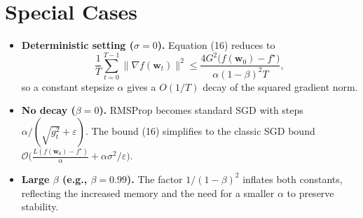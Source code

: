 \documentclass{article}
\begin{document}
\section*{Special Cases}
\begin{itemize}
\item \textbf{Deterministic setting ($\sigma=0$).}
Equation (16) reduces to
\[
\frac{1}{T}\sum_{t=0}^{T-1}\|\nabla f(\bm w_{t})\|^{2}
\le
\frac{4G^{2}\big(f(\bm w_{0})-f^{\star}\big)}{\alpha(1-\beta)^{2}T},
\]
so a constant stepsize $\alpha$ gives a $O(1/T)$ decay of the squared gradient norm.
\item \textbf{No decay ($\beta=0$).}
RMSProp becomes standard SGD with steps $\alpha/(\sqrt{g_{t}^{2}}+\varepsilon)$.
The bound (16) simplifies to the classic SGD bound
$\mathcal O\!\big(\frac{L(f(\bm w_{0})-f^{\star})}{\alpha}+\alpha\sigma^{2}/\varepsilon\big)$.
\item \textbf{Large $\beta$ (e.g., $\beta=0.99$).}
The factor $1/(1-\beta)^{2}$ inflates both constants, reflecting the increased
memory and the need for a smaller $\alpha$ to preserve stability.
\end{itemize}

\end{document}
